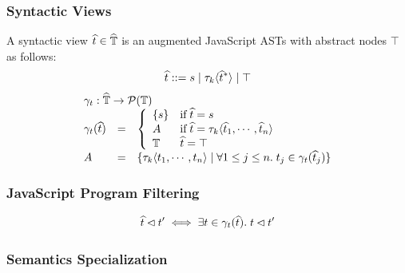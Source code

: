 \subsubsection{Syntactic Views} A syntactic view $\widehat{t} \in \widehat{\mathbb{T}}$ is an
augmented JavaScript ASTs with abstract nodes $\top$ as follows:
\[
  \widehat{t} ::= s \mid \tau_k \langle \widehat{t}^* \rangle \mid \top
\]
\[
  \begin{array}{lcl}
    \multicolumn{3}{l}{\treegamma: \atreeset \rightarrow \powerset{\treeset}}\\
    \treegamma(\atree) &=& \left\{
      \begin{array}{ll}
        \{ \str \} &
        \text{if} \; \atree = \str \\

        A & \text{if} \; \atree = \ty_k
        \langle \atree_1, \cdots, \atree_n \rangle \\

        \treeset & \atree = \top\\
      \end{array}
    \right.\\
    A &=& \{ \ty_k \langle \tree_1, \cdots, \tree_n \rangle \mid \forall 1 \leq
    j \leq n.  \; \tree_j \in \treegamma(\atree_j) \}
  \end{array}
\]

\subsubsection{JavaScript Program Filtering}

\[
  \widehat{t} \lhd t' \iff \exists t \in \gamma_t(\widehat{t}). \; t
  \lhd t'
\]

\todo

\subsubsection{Semantics Specialization}

\todo
